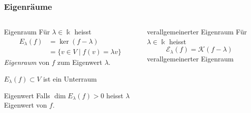 %
%
%
\begin{frame}[t]
\frametitle{Eigenräume}
\vspace{-15pt}
\begin{columns}[t,onlytextwidth]
\begin{column}{0.48\textwidth}
\begin{block}{Eigenraum}
Für $\lambda\in\Bbbk$ heisst
\begin{align*}
E_\lambda(f)
&=
\ker (f-\lambda)
\\
&=
\{v\in V\;|\; f(v) = \lambda v\}
\end{align*}
{\em Eigenraum} von $f$ zum Eigenwert $\lambda$.
\end{block}
$E_\lambda(f)\subset V$ ist ein Unterraum

\begin{block}{Eigenwert}
Falls $\dim E_\lambda(f)>0$ heisst $\lambda$ Eigenwert von $f$.
\end{block}

\end{column}
\begin{column}{0.48\textwidth}
\begin{block}{verallgemeinerter Eigenraum}
Für $\lambda\in \Bbbk$ heisst
\[
\mathcal{E}_\lambda(f)
=
\mathcal{K}(f-\lambda)
\]
verallgemeinerter Eigenraum
\end{block}
\end{column}
\end{columns}
\end{frame}
